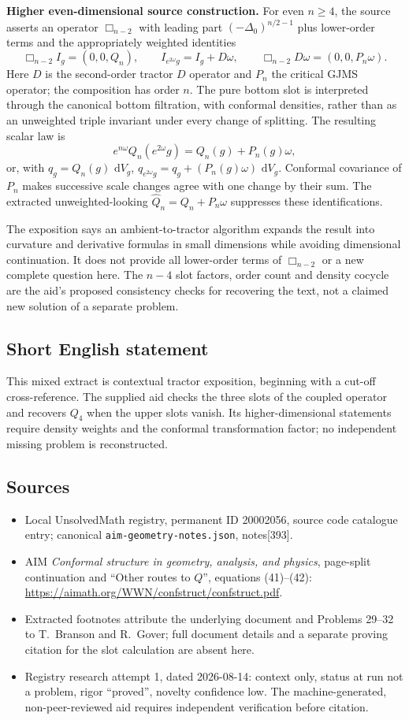 \documentclass[11pt]{article}
\newcommand{\dd}{\,\mathrm{d}}
\begin{document}
\textbf{Higher even-dimensional source construction.} For even $n\ge4$, the source asserts an operator $\Box_{n-2}$ with leading part $(-\Delta_0)^{n/2-1}$ plus lower-order terms and the appropriately weighted identities
\[
 \Box_{n-2}I_g=(0,0,Q_n),\qquad
 I_{e^{2\omega}g}=I_g+D\omega,\qquad
 \Box_{n-2}D\omega=(0,0,P_n\omega).
\]
Here $D$ is the second-order tractor $D$ operator and $P_n$ the critical GJMS operator; the composition has order $n$. The pure bottom slot is interpreted through the canonical bottom filtration, with conformal densities, rather than as an unweighted triple invariant under every change of splitting. The resulting scalar law is
\[
 e^{n\omega}Q_n(e^{2\omega}g)=Q_n(g)+P_n(g)\omega,
\]
or, with $q_g=Q_n(g)\,\dd V_g$, $q_{e^{2\omega}g}=q_g+(P_n(g)\omega)\,\dd V_g$. Conformal covariance of $P_n$ makes successive scale changes agree with one change by their sum. The extracted unweighted-looking $\widehat Q_n=Q_n+P_n\omega$ suppresses these identifications.

The exposition says an ambient-to-tractor algorithm expands the result into curvature and derivative formulas in small dimensions while avoiding dimensional continuation. It does not provide all lower-order terms of $\Box_{n-2}$ or a new complete question here. The $n-4$ slot factors, order count and density cocycle are the aid's proposed consistency checks for recovering the text, not a claimed new solution of a separate problem.
\subsection{Short English statement}
This mixed extract is contextual tractor exposition, beginning with a cut-off cross-reference. The supplied aid checks the three slots of the coupled operator and recovers $Q_4$ when the upper slots vanish. Its higher-dimensional statements require density weights and the conformal transformation factor; no independent missing problem is reconstructed.
\subsection{Sources}
\begin{itemize}
\item Local UnsolvedMath registry, permanent ID 20002056, source code catalogue entry; canonical \texttt{aim-geometry-notes.json}, notes[393].
\item AIM \emph{Conformal structure in geometry, analysis, and physics}, page-split continuation and ``Other routes to $Q$'', equations (41)--(42): \url{https://aimath.org/WWN/confstruct/confstruct.pdf}.
\item Extracted footnotes attribute the underlying document and Problems 29--32 to T.~Branson and R.~Gover; full document details and a separate proving citation for the slot calculation are absent here.
\item Registry research attempt 1, dated 2026-08-14: context only, status at run not a problem, rigor ``proved'', novelty confidence low. The machine-generated, non-peer-reviewed aid requires independent verification before citation.
\end{itemize}
\end{document}
